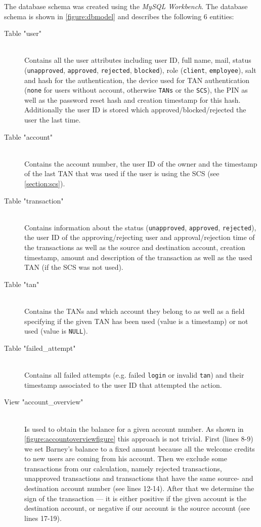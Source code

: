 The database schema was created using the \emph{MySQL Workbench}. The database schema is shown in \autoref{figure:dbmodel} and describes the following 6 entities:
\begin{description}
	\item[Table "user"] \hfill \\
	Contains all the user attributes including user ID, full name, mail, status (\texttt{unapproved}, \texttt{approved}, \texttt{rejected}, \texttt{blocked}), role (\texttt{client}, \texttt{employee}), salt and hash for the authentication, the device used for TAN authentication (\texttt{none} for users without account, otherwise \texttt{TANs} or the \texttt{SCS}), the PIN as well as the password reset hash and creation timestamp for this hash. Additionally the user ID is stored which approved/blocked/rejected the user the last time.
	
	\item[Table "account"] \hfill \\
	Contains the account number, the user ID of the owner and the timestamp of the last TAN that was used if the user is using the SCS (see \autoref{section:scs}).
	
	\item[Table "transaction"] \hfill \\
	Contains information about the status (\texttt{unapproved}, \texttt{approved}, \texttt{rejected}), the user ID of the approving/rejecting user and approval/rejection time of the transactions as well as the source and destination account, creation timestamp, amount and description of the transaction as well as the used TAN (if the SCS was not used).
	
	\item[Table "tan"] \hfill \\
	Contains the TANs and which account they belong to as well as a field specifying if the given TAN has been used (value is a timestamp) or not used (value is \texttt{NULL}).
	
	\item[Table "failed\_attempt"] \hfill \\
	Contains all failed attempts (e.g. failed \texttt{login} or invalid \texttt{tan}) and their timestamp associated to the user ID that attempted the action.
	
	\item[View "account\_overview"] \hfill \\
	Is used to obtain the balance for a given account number. As shown in \autoref{figure:accountoverviewfigure} this approach is not trivial. First (lines 8-9) we set Barney's balance to a fixed amount because all the welcome credits to new users are coming from his account. Then we exclude some transactions from our calculation, namely rejected transactions, unapproved transactions and transactions that have the same source- and destination account number (see lines 12-14). After that we determine the sign of the transaction --- it is either positive if the given account is the destination account, or negative if our account is the source account (see lines 17-19).
	

\end{description}
